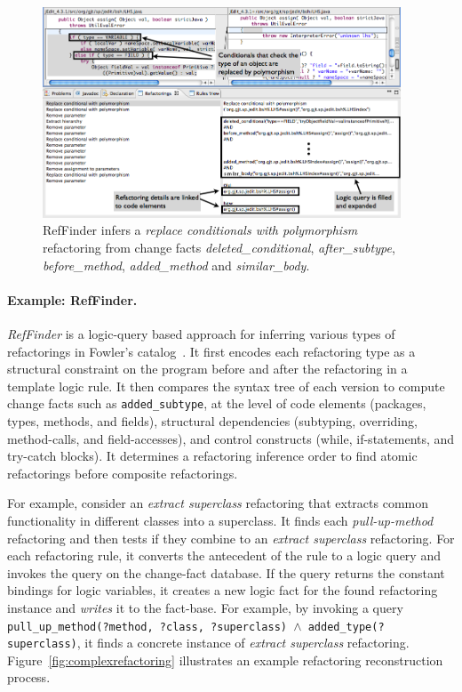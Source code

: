 \label{sec:intro} 
\begin{figure}
\centering
\includegraphics[width=0.95\textwidth]{images/reffinder.png}
\caption{RefFinder infers a {\it replace conditionals with polymorphism} refactoring from change facts {\it deleted\_conditional}, {\it after\_subtype}, {\it before\_method}, {\it added\_method} and {\it similar\_body}.\cite{Kim2010:reffinder}}
 \label{fig:reffinderscreenshot}
\end{figure}

\paragraph{Example: RefFinder.}

{\em RefFinder} is a logic-query based approach for inferring various types of refactorings in Fowler's catalog~\cite{Prete2010:reffinder}. It first encodes each refactoring type as a structural constraint on the program before and after the refactoring in a template logic rule. It then compares the syntax tree of each version to compute change facts such as {\tt added\-\_subtype}, at the level of code elements (packages, types, methods, and fields), structural dependencies (subtyping, overriding, method-calls, and field-accesses), and control constructs (while, if-statements, and try-catch blocks). It determines a refactoring inference order to find atomic refactorings before composite refactorings. 

For example, consider an \emph{extract superclass} refactoring that extracts common functionality in different classes into a superclass. It finds each {\it pull-up-method} refactoring and then tests if they combine to an \emph{extract superclass} refactoring. For each refactoring rule, it converts the antecedent of the rule to a logic query and invokes the query on the change-fact database. If the query returns the constant bindings for logic variables, it creates a new logic fact for the found refactoring instance and {\em writes} it to the fact-base. For example, by invoking a query {\tt pull\-\_up\_method\-(?method, ?class, ?superclass) $\wedge$ added\_type\-(?superclass)}, it finds a concrete instance of {\it extract superclass} refactoring. Figure~\ref{fig:complexrefactoring} illustrates an example refactoring reconstruction process. 

